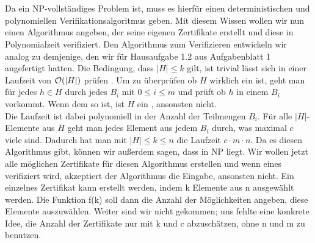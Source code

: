 \documentclass[a4paper]{article}
\begin{document}
	\maketitle
	\section{}
		\subsection{}
		Da \chitset ein NP-vollständiges Problem ist, muss es hierfür einen deterministischen und polynomiellen Verifikationsalgoritmus geben. \n
		Mit diesem Wissen wollen wir nun einen Algorithmus angeben, der seine eigenen Zertifikate erstellt und diese in Polynomialzeit verifiziert.
		Den Algorithmus zum Verifizieren entwickeln wir analog zu demjenige, den wir für Hausaufgabe 1.2 aus Aufgabenblatt 1 angefertigt hatten. \n
			Die Bedingung, dass $|H|\leq k$ gilt, ist trivial lässt sich  in einer Laufzeit von $\mathcal{O}(|H|)$ prüfen .\n
			Um zu überprüfen ob $H$ wirklich ein \hitset ist, geht man für jedes $h\in H$ durch jedes $B_i$ mit $0\leq i \leq m$ und prüft ob $h$ in einem $B_i$ vorkommt. Wenn dem so ist, ist $H$ ein \hitset, ansonsten nicht.\\
			Die Laufzeit ist dabei polynomiell in der Anzahl der Teilmengen $B_i$. Für alle $|H|$-Elemente aus $H$ geht man jedes Element aus jedem $B_i$ durch, was maximal $c$ viele sind. Dadurch hat man mit $|H| \leq k \leq n $ die Laufzeit $c\cdot m\cdot n$. \n
		Da es diesen Algorithmus gibt, können wir außerdem sagen, dass \chitset in NP liegt.
		Wir wollen jetzt alle möglichen Zertifikate für diesen Algorithmus erstellen und wenn eines verifiziert wird, akzeptiert der Algorithmus die Eingabe, ansonsten nicht. Ein einzelnes Zertifikat kann erstellt werden, indem k Elemente aus n ausgewählt werden.
		Die Funktion f(k) soll dann die Anzahl der Möglichkeiten angeben, diese Elemente auszuwählen.
		Weiter sind wir nicht gekommen; uns fehlte eine konkrete Idee, die Anzahl der Zertifikate nur mit k und c abzuschätzen, ohne n und m zu benutzen.
		
\end{document}
